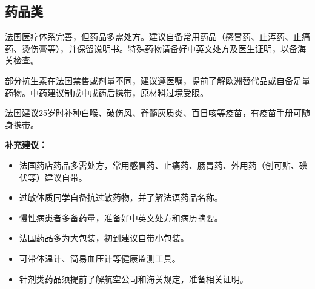 \subsection{药品类}

法国医疗体系完善，但药品多需处方。建议自备常用药品（感冒药、止泻药、止痛药、烫伤膏等），并保留说明书。特殊药物请备好中英文处方及医生证明，以备海关检查。

部分抗生素在法国禁售或剂量不同，建议遵医嘱，提前了解欧洲替代品或自备足量药物。中药建议制成中成药后携带，原材料过境受限。

法国建议25岁时补种白喉、破伤风、脊髓灰质炎、百日咳等疫苗，有疫苗手册可随身携带。

\textbf{补充建议：}
\begin{itemize}
    \item 法国药店药品多需处方，常用感冒药、止痛药、肠胃药、外用药（创可贴、碘伏等）建议自带。
    \item 过敏体质同学自备抗过敏药物，并了解法语药品名称。
    \item 慢性病患者多备药量，准备好中英文处方和病历摘要。
    \item 法国药品多为大包装，初到建议自带小包装。
    \item 可带体温计、简易血压计等健康监测工具。
    \item 针剂类药品须提前了解航空公司和海关规定，准备相关证明。
\end{itemize}
